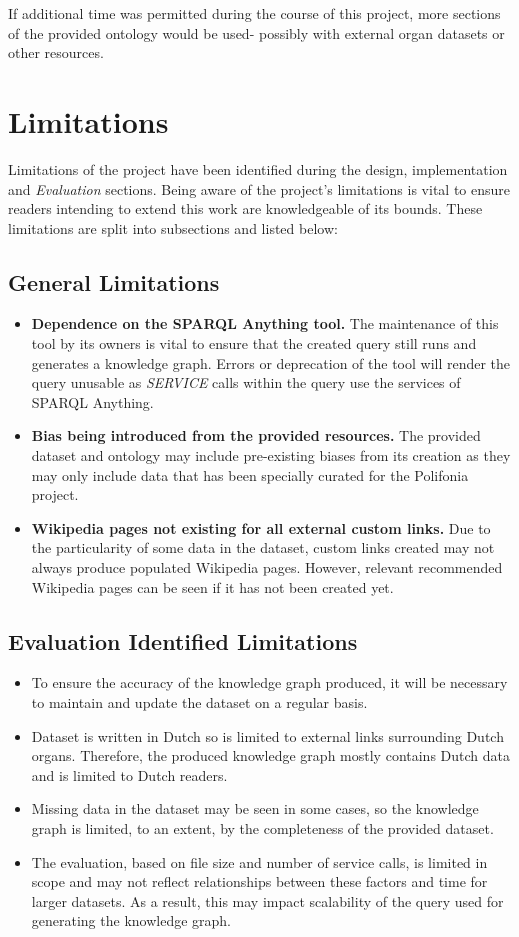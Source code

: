 If additional time was permitted during the course of this project, more sections of the provided ontology would be used- possibly with external organ datasets or other resources. 

\section{Limitations}
Limitations of the project have been identified during the design, implementation and \textit{Evaluation} sections. Being aware of the project's limitations is vital to ensure readers intending to extend this work are knowledgeable of its bounds. These limitations are split into subsections and listed below:

\subsection{General Limitations}
\begin{itemize}
    \item \textbf{Dependence on the SPARQL Anything tool.} The maintenance of this tool by its owners is vital to ensure that the created query still runs and generates a knowledge graph. Errors or deprecation of the tool will render the query unusable as \textit{SERVICE} calls within the query use the services of SPARQL Anything. 
    \item \textbf{Bias being introduced from the provided resources.} The provided dataset and ontology may include pre-existing biases from its creation as they may only include data that has been specially curated for the Polifonia project. 
    \item \textbf{Wikipedia pages not existing for all external custom links.} Due to the particularity of some data in the dataset, custom links created may not always produce populated Wikipedia pages. However, relevant recommended Wikipedia pages can be seen if it has not been created yet.  
\end{itemize}

\subsection{Evaluation Identified Limitations}
\begin{itemize}
    \item To ensure the accuracy of the knowledge graph produced, it will be necessary to maintain and update the dataset on a regular basis.
    \item Dataset is written in Dutch so is limited to external links surrounding Dutch organs. Therefore, the produced knowledge graph mostly contains Dutch data and is limited to Dutch readers.  
    \item Missing data in the dataset may be seen in some cases, so the knowledge graph is limited, to an extent, by the completeness of the provided dataset.
    \item  The evaluation, based on file size and number of service calls, is limited in scope and may not reflect relationships between these factors and time for larger datasets. As a result, this may impact scalability of the query used for generating the knowledge graph.
\end{itemize}

